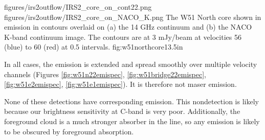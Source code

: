 \FigureTwo
{figures/irs2outflow/IRS2_core_on_cont22.png}
{figures/irs2outflow/IRS2_core_on_NACO_K.png}
{The W51 North core shown in \formaldehyde \twotwo emission in contours
overlaid on (a) the 14 GHz continuum and (b) the NACO K-band continuum image.
The contours are at 3 mJy/beam at velocities 56 (blue) to 60 (red) \kms at 0.5
\kms intervals.
}
{fig:w51northcore}{1}{3.5in}

In all cases, the emission is extended and spread smoothly over multiple
velocity channels (Figures \ref{fig:w51n22emispec},
\ref{fig:w51bridge22emispec}, \ref{fig:w51e2emispec}, \ref{fig:w51e1emispec}).
It is therefore not maser emission.

None of these detections have corresponding \oneone emission.  This
nondetection is likely because our brightness sensitivity at C-band is very
poor.  Additionally, the foreground cloud is a much stronger absorber in the
\oneone line, so any emission is likely to be obscured by foreground
absorption.





